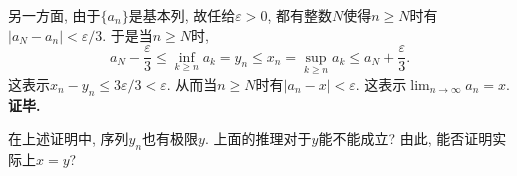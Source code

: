 另一方面, 由于$\{a_n\}$是基本列, 故任给$\varepsilon>0$, 都有整数$N$使得$n\geq N$时有$|a_N-a_n|<\varepsilon/3$. 于是当$n\geq N$时,
$$
a_N-\frac{\varepsilon}{3}\leq \inf_{k\geq n}a_k=y_n
\leq x_n=\sup_{k\geq n}a_k\leq a_N+\frac{\varepsilon}{3}.
$$
这表示$x_n-y_n\leq 3\varepsilon/3<\varepsilon$. 从而当$n\geq N$时有$|a_n-x|<\varepsilon$. 这表示$\lim_{n\to\infty}a_n=x$.\textbf{证毕.}

\begin{example}{}
在上述证明中, 序列$y_n$也有极限$y$. 上面的推理对于$y$能不能成立? 由此, 能否证明实际上$x=y$?
\end{example}


